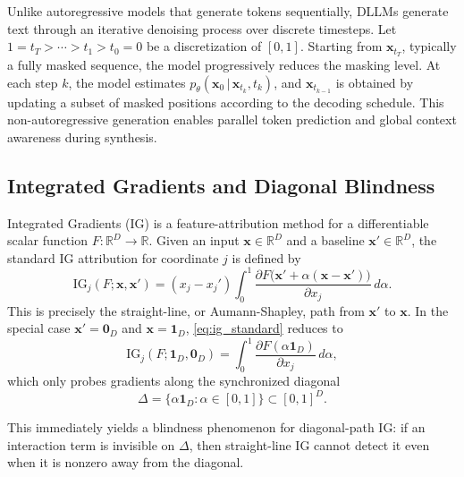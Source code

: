     Unlike autoregressive models that generate tokens sequentially, DLLMs generate text through an iterative denoising process over discrete timesteps. Let $1=t_T>\cdots>t_1>t_0=0$ be a discretization of $[0,1]$. Starting from $\mathbf{x}_{t_T}$, typically a fully masked sequence, the model progressively reduces the masking level. At each step $k$, the model estimates $p_\theta(\mathbf{x}_0 \,|\, \mathbf{x}_{t_k}, t_k)$, and $\mathbf{x}_{t_{k-1}}$ is obtained by updating a subset of masked positions according to the decoding schedule. This non-autoregressive generation enables parallel token prediction and global context awareness during synthesis.

    \subsection{Integrated Gradients and Diagonal Blindness}

    Integrated Gradients (IG) \cite{sundararajan2017axiomatic} is a feature-attribution method for a differentiable scalar function $F:\mathbb{R}^D\to\mathbb{R}$. Given an input $\mathbf{x}\in\mathbb{R}^D$ and a baseline $\mathbf{x}'\in\mathbb{R}^D$, the standard IG attribution for coordinate $j$ is defined by
    \begin{equation}
        \mathrm{IG}_j(F;\mathbf{x},\mathbf{x}')
        =
        (x_j-x_j')\int_0^1
        \frac{\partial F\!\bigl(\mathbf{x}' + \alpha(\mathbf{x}-\mathbf{x}')\bigr)}{\partial x_j}\,d\alpha.
        \label{eq:ig_standard}
    \end{equation}
    This is precisely the straight-line, or Aumann-Shapley, path from $\mathbf{x}'$ to $\mathbf{x}$. In the special case $\mathbf{x}'=\mathbf{0}_D$ and $\mathbf{x}=\mathbf{1}_D$, \eqref{eq:ig_standard} reduces to
    \begin{equation}
        \mathrm{IG}_j(F;\mathbf{1}_D,\mathbf{0}_D)
        =
        \int_0^1 \frac{\partial F(\alpha \mathbf{1}_D)}{\partial x_j}\,d\alpha,
        \label{eq:ig_diagonal}
    \end{equation}
    which only probes gradients along the synchronized diagonal
    \begin{equation}
        \Delta=\{\alpha\mathbf{1}_D:\alpha\in[0,1]\}\subset[0,1]^D.
    \end{equation}

    This immediately yields a blindness phenomenon for diagonal-path IG: if an interaction term is invisible on $\Delta$, then straight-line IG cannot detect it even when it is nonzero away from the diagonal.

